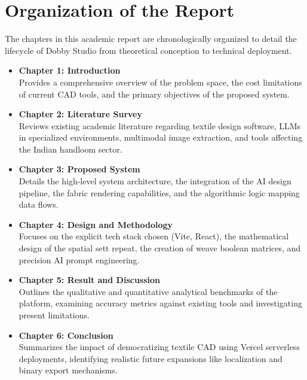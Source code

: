 \section{Organization of the Report}
The chapters in this academic report are chronologically organized to detail the lifecycle of Dobby Studio from theoretical conception to technical deployment.
\begin{itemize}
    \item \textbf{Chapter 1: Introduction} \\ Provides a comprehensive overview of the problem space, the cost limitations of current CAD tools, and the primary objectives of the proposed system.
    \item \textbf{Chapter 2: Literature Survey} \\ Reviews existing academic literature regarding textile design software, LLMs in specialized environments, multimodal image extraction, and tools affecting the Indian handloom sector.
    \item \textbf{Chapter 3: Proposed System} \\ Details the high-level system architecture, the integration of the AI design pipeline, the fabric rendering capabilities, and the algorithmic logic mapping data flows.
    \item \textbf{Chapter 4: Design and Methodology} \\ Focuses on the explicit tech stack chosen (Vite, React), the mathematical design of the spatial sett repeat, the creation of weave boolean matrices, and precision AI prompt engineering.
    \item \textbf{Chapter 5: Result and Discussion} \\ Outlines the qualitative and quantitative analytical benchmarks of the platform, examining accuracy metrics against existing tools and investigating present limitations.
    \item \textbf{Chapter 6: Conclusion} \\ Summarizes the impact of democratizing textile CAD using Vercel serverless deployments, identifying realistic future expansions like localization and binary export mechanisms.
\end{itemize}

